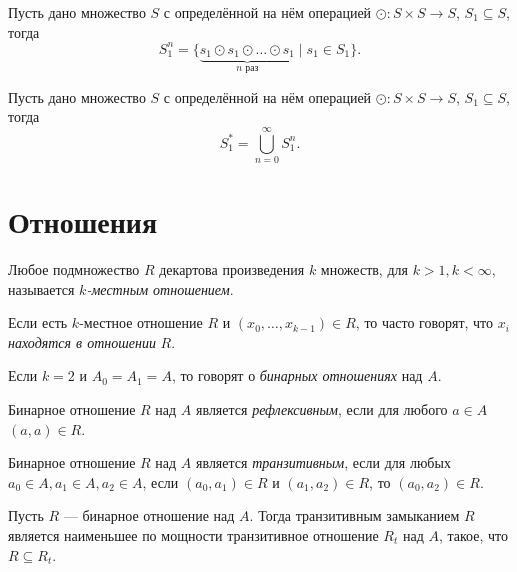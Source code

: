 \begin{definition}
    Пусть дано множество $S$ с определённой на нём операцией $\odot: S \times S \to S$, $S_1 \subseteq S$, тогда
    \[S_1^n = \{ \underbrace{s_1 \odot s_1 \odot \dots \odot s_1}_{\text{$n$ раз}} \mid s_1 \in S_1\}.\]
\end{definition}

\begin{definition}
    \label{def:set_closure}
    Пусть дано множество $S$ с определённой на нём операцией $\odot: S \times S \to S$, $S_1 \subseteq S$, тогда
    \[S_1^* = \bigcup_{n = 0}^{\infty} S_1^n.\]
\end{definition}


\section{Отношения}

\begin{definition}[Отношение]
    Любое подмножество $R$ декартова произведения $k$ множеств, для $k > 1, k < \infty$, называется \emph{$k$-местным отношением}.
\end{definition}

Если есть $k$-местное отношение $R$ и $(x_0,\ldots, x_{k-1}) \in R$, то часто говорят, что $x_i$ \emph{находятся в отношении} $R$.

Если $k=2$ и $A_0 = A_1 = A$, то говорят о \emph{бинарных отношениях} над $A$.

\begin{definition}
    Бинарное отношение $R$ над $A$ является \emph{рефлексивным}, если для любого $a \in A$ $(a,a) \in R$.
\end{definition}


\begin{definition}
    Бинарное отношение $R$ над $A$ является \emph{транзитивным}, если для любых $a_0 \in A, a_1 \in A, a_2 \in A$, если $(a_0,a_1) \in R$ и  $(a_1,a_2) \in R$, то $(a_0,a_2) \in R$.
\end{definition}

\begin{definition}
    Пусть $R$ --- бинарное отношение над $A$.
    Тогда транзитивным замыканием $R$ является наименьшее по мощности транзитивное отношение $R_t$ над $A$, такое, что $R \subseteq R_t$.
\end{definition}

